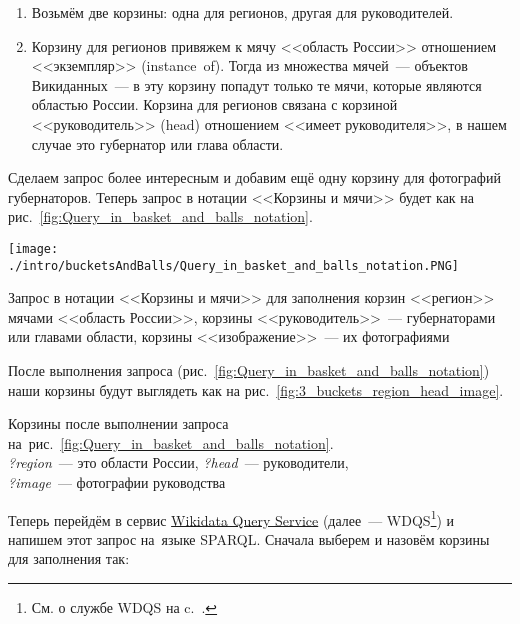 \begin{enumerate}
    \item Возьмём две корзины: одна для регионов, другая для руководителей.
    \item Корзину для регионов привяжем к мячу <<область России>> отношением <<экземпляр>> (instance~of). 
        Тогда из множества мячей~--- объектов Викиданных~--- в эту корзину попадут только те мячи, которые являются областью России. 
        Корзина для регионов связана с корзиной <<руководитель>> (head) отношением <<имеет руководителя>>, 
        в нашем случае это губернатор или глава области.
\end{enumerate}


Сделаем запрос более интересным и добавим ещё одну корзину для фотографий губернаторов. 
Теперь запрос в нотации <<Корзины и мячи>> будет как на рис.~\ref{fig:Query_in_basket_and_balls_notation}.

\begin{marginfigure}
    \texttt{[image: ./intro/bucketsAndBalls/Query\_in\_basket\_and\_balls\_notation.PNG]}
    \caption[Запрос в нотации <<Корзины и мячи>> для заполнения корзин мячами.]{Запрос в нотации <<Корзины и мячи>> для заполнения корзин <<регион>> мячами <<область России>>, корзины <<руководитель>>~--- губернаторами или главами области, корзины <<изображение>>~--- их фотографиями}
	\label{fig:Query_in_basket_and_balls_notation}
\end{marginfigure}




\newpage
После выполнения запроса (рис.~\ref{fig:Query_in_basket_and_balls_notation}) 
наши корзины будут выглядеть как на рис.~\ref{fig:3_buckets_region_head_image}.

\begin{marginfigure}%
{%
		\setlength{\fboxsep}{0pt}%
		\setlength{\fboxrule}{1pt}%
}
    \caption[Заполненные корзины после выполнении запроса.]{Корзины после выполнении запроса 
    на~рис.~\ref{fig:Query_in_basket_and_balls_notation}.\\ 
    \textit{?region}~--- это области России, \textit{?head}~--- руководители,\\
    \textit{?image}~--- фотографии руководства}
	\label{fig:3_buckets_region_head_image}
\end{marginfigure}

Теперь перейдём в сервис \href{https://query.wikidata.org/}{Wikidata Query Service} 
(далее~--- WDQS\footnote[][15pt]{См. о службе WDQS на c.~\pageref{sect:WDQS}.}) 
и напишем этот запрос на~языке SPARQL. Сначала выберем и назовём корзины для заполнения так:

